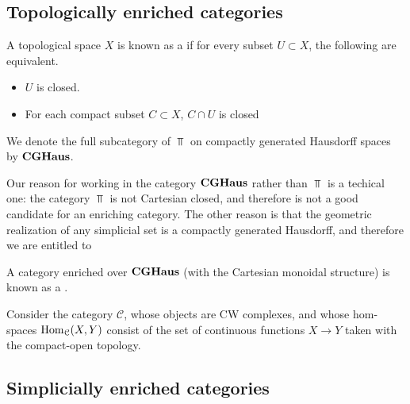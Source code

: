 \documentclass[main.tex]{subfiles}
\begin{document}
\subsection{Topologically enriched categories}
\label{ssc:topologically_enriched_categories}

\begin{definition}
  \label{def:compactly_generated_hausdorff_space}
  A topological space $X$ is known as a  if for every subset $U \subset X$, the following are equivalent.
  \begin{itemize}
    \item $U$ is closed.

    \item For each compact subset $C \subset X$, $C \cap U$ is closed
  \end{itemize}

  We denote the full subcategory of $\Top$ on compactly generated Hausdorff spaces by $\mathbf{CGHaus}$.
\end{definition}

Our reason for working in the category $\mathbf{CGHaus}$ rather than $\Top$ is a techical one: the category $\Top$ is not Cartesian closed, and therefore is not a good candidate for an enriching category. The other reason is that the geometric realization of any simplicial set is a compactly generated Hausdorff, and therefore we are entitled to

\begin{definition}
  \label{def:topological_category}
  A category enriched over $\mathbf{CGHaus}$ (with the Cartesian monoidal structure) is known as a .
\end{definition}

\begin{example}
  Consider the category $\mathcal{C}$, whose objects are CW complexes, and whose hom-spaces $\operatorname{Hom}_{\mathcal{C}}(X, Y)$ consist of the set of continuous functions $X \to Y$ taken with the compact-open topology.
\end{example}

\subsection{Simplicially enriched categories}
\label{ssc:simplicially_enriched_categories}
\end{document}
